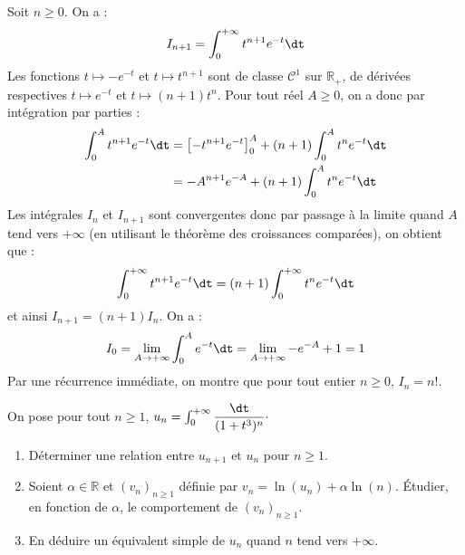 \documentclass[a4paper,10pt]{report}
\begin{document}
\medskip

\noindent Soit $n \geq 0$. On a :
$$ I_{n+1} = \int_0^{+ \infty} t^{n+1} e^{-t} \dt$$
Les fonctions $t \mapsto -e^{-t}$ et $t \mapsto t^{n+1}$ sont de classe $\mathcal{C}^1$ sur $\mathbb{R}_+$, de dérivées respectives $t \mapsto e^{-t}$ et $t \mapsto (n+1)t^n$. Pour tout réel $A \geq 0$, on a donc par intégration par parties :
\begin{align*}
\int_0^A t^{n+1} e^{-t} \dt & = \left[- t^{n+1} e^{-t} \right]_0^A +  (n+1) \int_0^A t^{n} e^{-t} \dt \\
& = -A^{n+1} e^{-A} +  (n+1) \int_0^A t^{n} e^{-t} \dt
\end{align*}
Les intégrales $I_n$ et $I_{n+1}$ sont convergentes donc par passage à la limite quand $A$ tend vers $+ \infty$ (en utilisant le théorème des croissances comparées), on obtient que :
$$ \int_0^{+ \infty} t^{n+1} e^{-t} \dt = (n+1)\int_0^{+ \infty} t^{n} e^{-t} \dt$$
et ainsi $I_{n+1}=(n+1) I_n$. On a :
$$ I_0 = \lim_{A \rightarrow + \infty} \int_0^A e^{-t} \dt = \lim_{A \rightarrow + \infty} -e^{-A}+1 = 1$$
Par une récurrence immédiate, on montre que pour tout entier $n \geq 0$, $I_n=n!$.

\begin{Exercice}{} On pose pour tout $n \geq 1$, $u_n = \int_{0}^{+ \infty} \dfrac{\dt}{(1+t^3)^n} \cdot$
\begin{enumerate}
\item Déterminer une relation entre $u_{n+1}$ et $u_n$ pour $n \geq 1$.
\item Soient $\alpha \in \mathbb{R}$ et $(v_n)_{n \geq 1}$ définie par $v_n = \ln(u_n) + \alpha \ln(n)$. Étudier, en fonction de $\alpha$, le comportement de $(v_n)_{n \geq 1}$.
\item En déduire un équivalent simple de $u_n$ quand $n$ tend vers $+ \infty$.
\end{enumerate}
\end{Exercice} 
\end{document}

